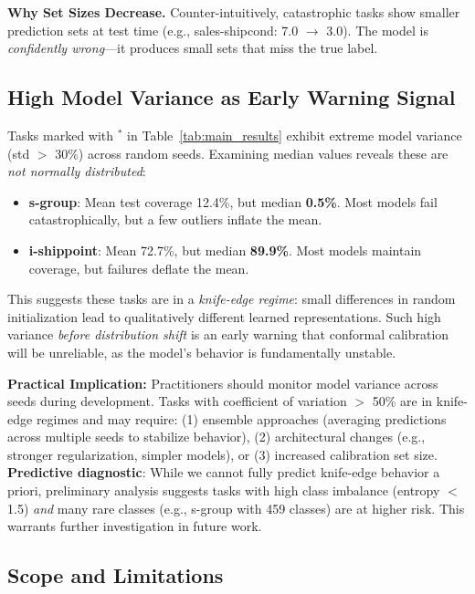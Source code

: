 \documentclass[sigconf]{acmart}
\begin{document}
\textbf{Why Set Sizes Decrease.} Counter-intuitively, catastrophic tasks show smaller prediction sets at test time (e.g., sales-shipcond: 7.0 $\rightarrow$ 3.0). The model is \emph{confidently wrong}---it produces small sets that miss the true label.

\subsection{High Model Variance as Early Warning Signal}

Tasks marked with $^*$ in Table~\ref{tab:main_results} exhibit extreme model
variance (std $>$ 30\%) across random seeds. Examining median values reveals
these are \textit{not normally distributed}:

\begin{itemize}
    \item \textbf{s-group}: Mean test coverage 12.4\%, but median \textbf{0.5\%}.
    Most models fail catastrophically, but a few outliers inflate the mean.

    \item \textbf{i-shippoint}: Mean 72.7\%, but median \textbf{89.9\%}.
    Most models maintain coverage, but failures deflate the mean.
\end{itemize}

This suggests these tasks are in a \textit{knife-edge regime}: small differences
in random initialization lead to qualitatively different learned representations.
Such high variance \textit{before distribution shift} is an early warning that
conformal calibration will be unreliable, as the model's behavior is fundamentally unstable.

\textbf{Practical Implication:} Practitioners should monitor model variance
across seeds during development. Tasks with coefficient of variation $>$ 50\%
are in knife-edge regimes and may require: (1) ensemble approaches (averaging predictions across multiple seeds to stabilize behavior), (2) architectural changes (e.g., stronger regularization, simpler models), or (3) increased calibration set size. \textbf{Predictive diagnostic}: While we cannot fully predict knife-edge behavior a priori, preliminary analysis suggests tasks with high class imbalance (entropy $<$ 1.5) \emph{and} many rare classes (e.g., s-group with 459 classes) are at higher risk. This warrants further investigation in future work.

\subsection{Scope and Limitations}
\end{document}
